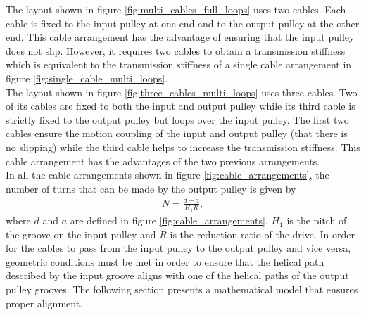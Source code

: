 The layout shown in figure \ref{fig:multi_cables_full_loops} uses two cables. Each cable is fixed to the input pulley at one end and to the output pulley at the other end. This cable arrangement has the advantage of ensuring that the input pulley does not slip. However, it requires two cables to obtain a transmission stiffness which is equivalent to the transmission stiffness of a single cable arrangement in figure \ref{fig:single_cable_multi_loops}.\\
The layout shown in figure  \ref{fig:three_cables_multi_loops} uses three cables. Two of its cables are fixed to both the input and output pulley while its third cable is strictly fixed to the output pulley but loops over the input pulley. The first two cables ensure the motion coupling of the input and output pulley (that there is no slipping) while the third cable helps to increase the transmission stiffness. This cable arrangement has the advantages of the two previous arrangements. \\
In all the cable arrangements shown in figure \ref{fig:cable_arrangements}, the number of turns that can be made by the output pulley is given by 
\begin{align}
N = \frac{d-a}{H_1R},
\end{align}
where  $d$ and $a$ are defined in figure \ref{fig:cable_arrangements}, $H_1$ is the pitch of the groove on the input pulley and $R$ is the reduction ratio of the drive.
In order for the cables to pass from the input pulley to the output pulley and vice versa, geometric conditions must be met in order to ensure that the helical path described by the input groove aligns with one of the helical paths of the output pulley grooves. The following section presents a mathematical model that ensures proper alignment.

